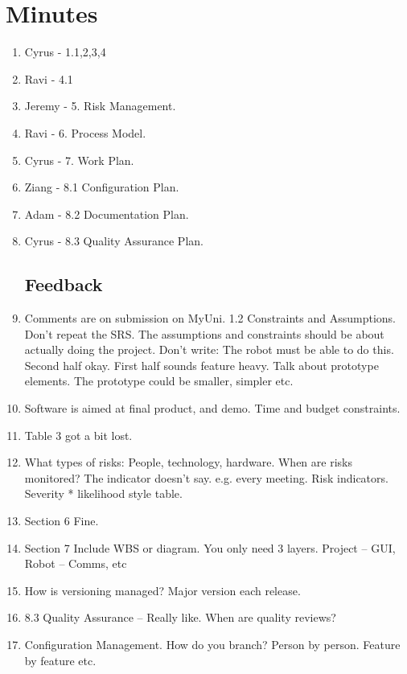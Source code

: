 \documentclass{article}
\begin{document}
\section{Minutes}
\begin{enumerate}
\subsection{SPMP Presentation}
\item Cyrus - 1.1,2,3,4\\
\item Ravi - 4.1\\
\item Jeremy - 5. Risk Management.\\
\item Ravi - 6. Process Model.\\
\item Cyrus - 7. Work Plan.\\
\item Ziang - 8.1 Configuration Plan.\\
\item Adam - 8.2 Documentation Plan.\\
\item Cyrus - 8.3 Quality Assurance Plan.\\

\subsection{Feedback}
\item Comments are on submission on MyUni. 1.2 Constraints and Assumptions. Don’t repeat the SRS. The assumptions and constraints should be about actually doing the project. Don't write: The robot must be able to do this. Second half okay. First half sounds feature heavy. Talk about prototype elements. The prototype could be smaller, simpler etc.
\item Software is aimed at final product, and demo. Time and budget constraints.
\item Table 3 got a bit lost.
\item What types of risks: People, technology, hardware. When are risks monitored? The indicator doesn’t say. e.g. every meeting. Risk indicators. Severity * likelihood style table.
\item Section 6 Fine.
\item Section 7 Include WBS or diagram. You only need 3 layers. Project – GUI, Robot – Comms, etc
\item How is versioning managed? Major version each release. 
\item 8.3 Quality Assurance – Really like. When are quality reviews?
\item Configuration Management. How do you branch? Person by person. Feature by feature etc. 


\end{enumerate}
\end{document}

